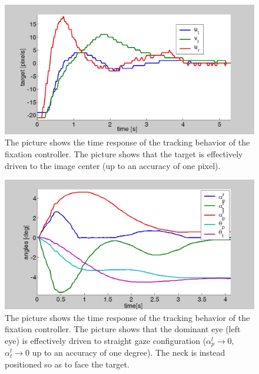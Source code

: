 \begin{figure}[tbp]
\centering
\includegraphics[width=130mm]{Figure/TimeResponseImage.jpg}
\caption{The picture shows the time response of the tracking behavior of the fixation controller. The picture shows that the target is effectively driven to the image center (up to an accuracy of one pixel).}
\label{Fig:TimeResponse}
\end{figure}

\begin{figure}[tbp]
\centering
\includegraphics[width=130mm]{Figure/TimeResponseEyesNeck.jpg}
\caption{The picture shows the time response of the tracking behavior of the fixation controller. The picture shows that the dominant eye (left eye) is effectively driven to straight gaze configuration ($\alpha_p^l \rightarrow 0$, $\alpha_t^l \rightarrow 0$ up to an accuracy of one degree). The neck is instead positioned so as to face the target.}
\label{Fig:TimeResponseNeck}
\end{figure}
